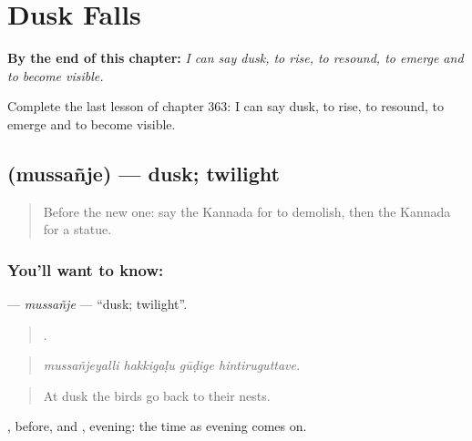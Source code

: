 
\chapter{Dusk Falls}
\label{ch:ka-dusk-falls}

\begin{chapteropening}
\textbf{By the end of this chapter:} \emph{I can say dusk, to rise, to resound, to emerge and to become visible.}

Complete the last lesson of chapter 363: I can say dusk, to rise, to resound, to emerge and to become visible.
\end{chapteropening}

\section[\texorpdfstring{\kn{ಮುಸ್ಸಂಜೆ} (mussañje)}{ಮುಸ್ಸಂಜೆ (mussañje)}]{ (mussañje) — dusk; twilight}

\label{lesson:KA-C363-mussanje}



\begin{quote}
Before the new one: say the Kannada for to demolish, then the Kannada for a statue.
\end{quote}

\subsection*{You'll want to know: }
\textbf{} — \emph{mussañje} — \textquotedblleft{}dusk; twilight\textquotedblright{}.

\begin{quote}
   .
\end{quote}

\begin{quote}
\emph{mussañjeyalli hakkigaḷu gūḍige hintiruguttave.}
\end{quote}

\begin{quote}
At dusk the birds go back to their nests.
\end{quote}

, before, and , evening: the time as evening comes on.


